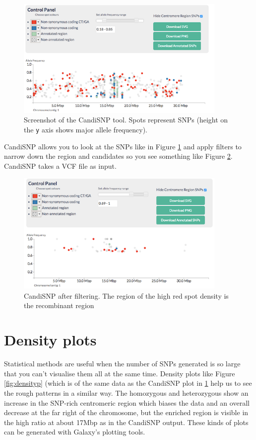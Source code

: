 \documentclass[12pt,]{book}
\theoremstyle{definition}
\theoremstyle{definition}
\theoremstyle{remark}
\begin{document}
\begin{figure}
\includegraphics[width=4in]{assets/candisnp} \caption{Screenshot of the CandiSNP tool. Spots represent SNPs
(height on the \texttt{y} axis shows major allele frequency).}\label{fig:csnpb4}
\end{figure}

CandiSNP allows you to look at the SNPs like in Figure \ref{fig:csnpb4}
and apply filters to narrow down the region and candidates so you see
something like Figure \ref{fig:csnp}. CandiSNP takes a VCF file as
input.




\begin{figure}
\includegraphics[width=4in]{assets/candisnp_after} \caption{CandiSNP after filtering. The region of the high red
spot density is the recombinant region}\label{fig:csnp}
\end{figure}

\section{Density plots}\label{density-plots}

Statistical methods are useful when the number of SNPs generated is so
large that you can't visualise them all at the same time. Density plots
like Figure \ref{fig:densityp} (which is of the same data as the
CandiSNP plot in \ref{fig:csnpb4} help us to see the rough patterns in a
similar way. The homozygous and heterozygous show an increase in the
SNP-rich centromeric region which biases the data and an overall
decrease at the far right of the chromosome, but the enriched region is
visible in the high ratio at about 17Mbp as in the CandiSNP output.
These kinds of plots can be generated with Galaxy's plotting tools.
\end{document}
